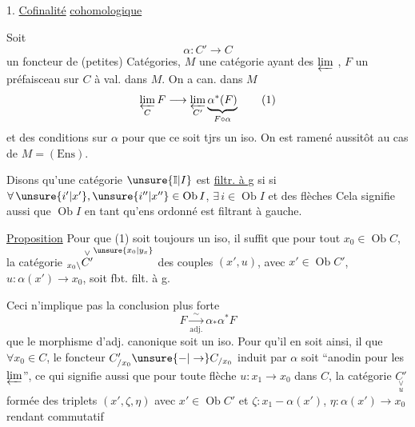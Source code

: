 1. \uline{Cofinalité} \uline{cohomologique}

Soit
\[
 \alpha:C'\longrightarrow C
\]
un foncteur de (petites) Catégories, $M$ une catégorie ayant des $\varprojlim$ , $F$ un préfaisceau sur $C$ à val. dans $M$. On a  can. dans $M$
\[
 \varprojlim_C F\longrightarrow\varprojlim_{C'}\underbrace{\alpha^*(F)}_{F\circ\alpha}
 \tag*{(1)}
\]
et \uline{}  des conditions sur $\alpha$ pour que ce soit tjrs un iso. On est ramené aussitôt au cas de $M=(\mathrm{Ens})$.
 

Disons qu'une catégorie $\unsure{\mathbb I|I}$ est  \uline{filtr. à g} si  si $\forall\,\unsure{i'|x'},\unsure{i''|x''}\in\operatorname{Ob}I$, $\exists\,i\in\operatorname{Ob}I$ et des flèches
Cela signifie aussi que $\operatorname{Ob}I$ en tant qu'ens ordonné est filtrant à gauche.

\uline{Proposition} Pour que (1) soit toujours un iso,  il suffit que pour tout $x_0\in\operatorname{Ob} C$, la catégorie ${}_{x_0\backslash}\overset{\vee}{C'}^{\unsure{x_0|y_x}}$ des couples $(x',u)$, avec $x'\in\operatorname{Ob}C'$, $u:\alpha(x')\longrightarrow x_0$, soit fbt. filt. à g.

Ceci n'implique pas la conclusion plus forte
\[
 F\xrightarrow[\mathrm{adj.}]{\sim}\alpha_*\alpha^*F
\]
que le morphisme d'adj. canonique soit un iso. Pour qu'il en soit ainsi, il   que $\forall x_0\in C$, le foncteur  $C'_{/x_0}\unsure{-|\to}C_{/x_0}$ induit par $\alpha$ soit ``anodin pour les $\varprojlim$'', ce qui signifie aussi que pour toute flèche $u:x_1\longrightarrow x_0$ dans $C$, la catégorie $\underset{u}{\underset{\vee}{C'}}$ formée des triplets $(x',\zeta,\eta)$ avec $x'\in\operatorname{Ob}C'$ et $\zeta:x_1-\alpha(x')$, $\eta:\alpha(x')\longrightarrow x_0$ rendant commutatif
